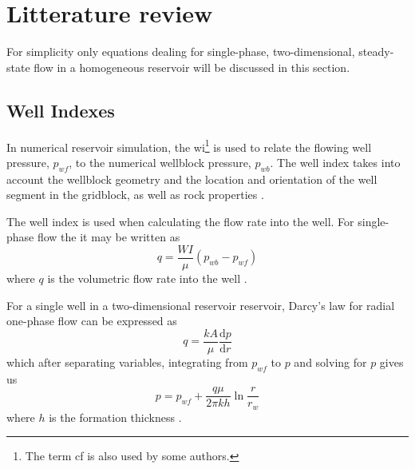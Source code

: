 
\section{Litterature review} %
\label{sec:litterature_review}
For simplicity only equations dealing for single-phase, two-dimensional, steady-state flow in a homogeneous reservoir will be discussed in this section.

\subsection{Well Indexes} %
\label{sub:well_indices}
In numerical reservoir simulation, the \gls{wi}\footnote{The term \gls{cf} is also used by some authors\cite{Peaceman2003New,Schlumberger2013Eclipse}.} is used to relate the flowing well pressure, $p_{wf}$,  to the numerical wellblock pressure, $p_{wb}$. The well index takes into account the wellblock geometry and the location and orientation of the well segment in the gridblock, as well as rock properties \cite{Peaceman2003New}.

The well index is used when calculating the flow rate into the well. For single-phase flow the it may be written as
\begin{equation}
    q = \frac{WI}{\mu} \left( p_{wb} - p_{wf} \right)
\end{equation}
where $q$ is the volumetric flow rate into the well \cite{Peaceman2003New}.

For a single well in a two-dimensional reservoir reservoir, Darcy's law for radial one-phase flow can be expressed as
\begin{equation}
    q = \frac{kA}{\mu} \frac{\mathrm{d}p}{\mathrm{d}r}
\end{equation}
which after separating variables, integrating from $p_{wf}$ to $p$ and solving for $p$ gives us
\begin{equation}
    p = p_{wf} + \frac{q\mu}{2\pi kh} \ln{\frac{r}{r_w}}
\end{equation}
where $h$ is the formation thickness \cite{Dake1978Developments}.

